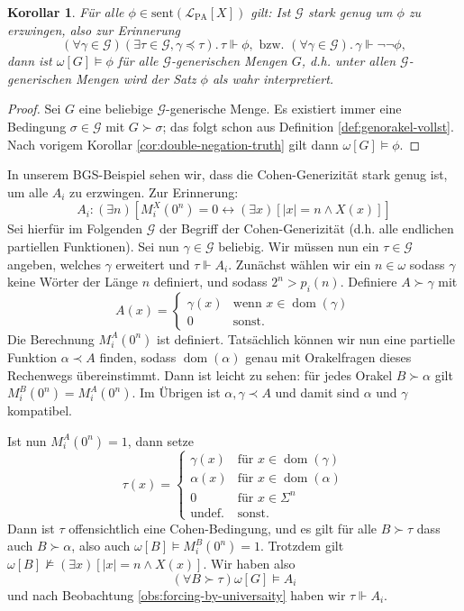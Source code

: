 \documentclass[nofonts]{uebung}
\newtheorem{corollary}[theorem]{Korollar}
\theoremstyle{definition}
\DeclareMathOperator{\dom}{dom}
\begin{document}
\begin{corollary}\label{corollary:strong-enough-generic-truth}
    Für alle $\phi\in \mathrm{sent}(\mathcal L_{\mathrm{PA}}[X])$ gilt:
    Ist $\mathcal G$ stark genug um $\phi$ zu erzwingen, also zur Erinnerung
    \[ (\forall \gamma\in\mathcal G)(\exists \tau\in\mathcal G, \gamma\preceq\tau).\,\tau\Vdash\phi,\text{ bzw. } (\forall\gamma\in\mathcal G).\,\gamma\Vdash\neg\neg\phi, \]
    dann ist $\omega[G]\vDash\phi$  für alle $\mathcal G$-generischen Mengen $G$, 
    d.h. unter allen $\mathcal G$-generischen Mengen wird der Satz $\phi$ als wahr interpretiert.
\end{corollary}
\begin{proof}
    Sei $G$ eine beliebige $\mathcal G$-generische Menge.
    Es existiert immer eine Bedingung $\sigma\in\mathcal G$ mit $G\succ \sigma$; das folgt schon aus Definition \ref{def:genorakel-vollst}.
    Nach vorigem Korollar \ref{cor:double-negation-truth} gilt dann $\omega[G]\vDash \phi$.
\end{proof}

In unserem BGS-Beispiel sehen wir, dass die Cohen-Generizität stark genug ist, um alle $A_i$ zu erzwingen. Zur Erinnerung:
\[ A_i : (\exists n)[M_i^X(0^n)=0 \leftrightarrow (\exists x)[|x|=n\land X(x)]] \]
Sei hierfür im Folgenden $\mathcal G$ der Begriff der Cohen-Generizität (d.h. alle endlichen partiellen Funktionen).
Sei nun $\gamma\in\mathcal G$ beliebig.
Wir müssen nun ein $\tau\in\mathcal G$ angeben, welches $\gamma$ erweitert und $\tau\Vdash A_i$.
Zunächst wählen wir ein $n\in\omega$ sodass $\gamma$ keine Wörter der Länge $n$ definiert, und sodass $2^n>p_i(n)$.
Definiere $A\succ\gamma$ mit
\[ A(x) = \begin{cases} \gamma(x) & \text{wenn $x\in\dom(\gamma)$}\\ 0 & \text{sonst}. \end{cases} \]
Die Berechnung $M_i^A(0^n)$ ist definiert.
Tatsächlich können wir nun eine partielle Funktion $\alpha\prec A$ finden, sodass $\dom(\alpha)$ genau mit Orakelfragen dieses Rechenwegs übereinstimmt.
Dann ist leicht zu sehen: für jedes Orakel $B\succ\alpha$ gilt $M_i^B(0^n)=M_i^A(0^n)$.
Im Übrigen ist $\alpha,\gamma\prec A$ und damit sind $\alpha$ und $\gamma$ kompatibel.

Ist nun $M_i^A(0^n)=1$, dann setze
\[ \tau(x) =\begin{cases} \gamma(x) & \text{für $x\in\dom(\gamma)$}\\\alpha(x) & \text{für $x\in\dom(\alpha)$}\\0&\text{für $x\in\Sigma^n$}\\\text{undef.} & \text{sonst}.\end{cases} \]
Dann ist $\tau$ offensichtlich eine Cohen-Bedingung, und es gilt für alle $B\succ \tau$ dass auch $B\succ\alpha$, also auch $\omega[B] \vDash M_i^B(0^n)=1$.
Trotzdem gilt $\omega[B] \not\vDash (\exists x)[|x|=n\land X(x)]$.
Wir haben also
\[ (\forall B\succ \tau) \omega[G] \vDash A_i \]
und nach Beobachtung \ref{obs:forcing-by-universaity} haben wir $\tau\Vdash A_i$.
\end{document}
